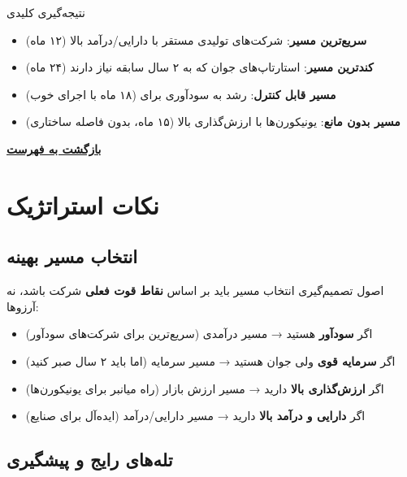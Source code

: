 \documentclass[10pt]{report}
\newcommand{\lat}[1]{\lr{#1}}
\newcommand{\returnhome}{\vspace{0.5em}\noindent\protect\hyperlink{home}{\colorbox{conceptBox}{\color{headerColor}\textbf{بازگشت به فهرست}}}\par}
\begin{document}
\begin{summarybox}{نتیجه‌گیری کلیدی}
\begin{itemize}[rightmargin=1.5cm]
\item \textbf{سریع‌ترین مسیر}: شرکت‌های تولیدی مستقر با دارایی/درآمد بالا (۱۲ ماه)
\item \textbf{کندترین مسیر}: استارتاپ‌های جوان که به ۲ سال سابقه نیاز دارند (۲۴ ماه)
\item \textbf{مسیر قابل کنترل}: رشد به سودآوری برای \lat{SaaS} (۱۸ ماه با اجرای خوب)
\item \textbf{مسیر بدون مانع}: یونیکورن‌ها با ارزش‌گذاری بالا (۱۵ ماه، بدون فاصله ساختاری)
\end{itemize}
\end{summarybox}

\returnhome

\clearpage
\chapter{نکات استراتژیک}

\section{انتخاب مسیر بهینه}

\begin{principlebox}{اصول تصمیم‌گیری}
انتخاب مسیر باید بر اساس \textbf{نقاط قوت فعلی} شرکت باشد، نه آرزوها:

\begin{itemize}[rightmargin=1.5cm]
\item اگر \textbf{سودآور} هستید → مسیر درآمدی (سریع‌ترین برای شرکت‌های سودآور)
\item اگر \textbf{سرمایه قوی} ولی جوان هستید → مسیر سرمایه (اما باید ۲ سال صبر کنید)
\item اگر \textbf{ارزش‌گذاری بالا} دارید → مسیر ارزش بازار (راه میانبر برای یونیکورن‌ها)
\item اگر \textbf{دارایی و درآمد بالا} دارید → مسیر دارایی/درآمد (ایده‌آل برای صنایع)
\end{itemize}
\end{principlebox}
\clearpage
\section{تله‌های رایج و پیشگیری}
\end{document}
